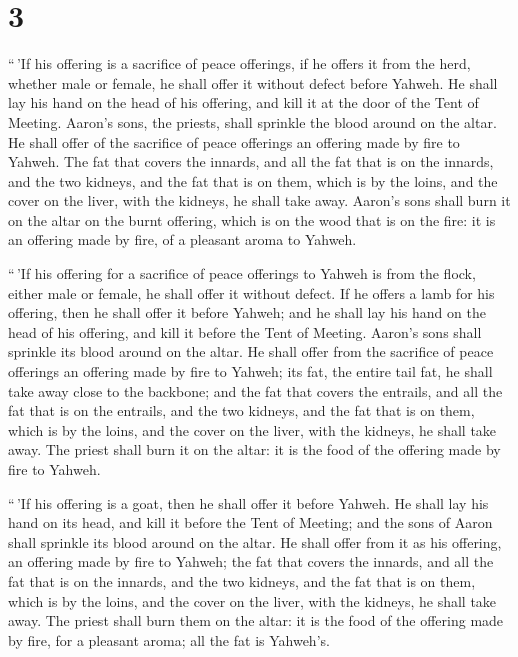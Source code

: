 \hypertarget{section-2}{%
\section{3}\label{section-2}}

 ``\,'If his offering is a sacrifice of peace offerings,
if he offers it from the herd, whether male or female, he shall offer it
without defect before Yahweh.  He shall lay his hand on
the head of his offering, and kill it at the door of the Tent of
Meeting. Aaron's sons, the priests, shall sprinkle the blood around on
the altar.  He shall offer of the sacrifice of peace
offerings an offering made by fire to Yahweh. The fat that covers the
innards, and all the fat that is on the innards,  and the
two kidneys, and the fat that is on them, which is by the loins, and the
cover on the liver, with the kidneys, he shall take away. 
Aaron's sons shall burn it on the altar on the burnt offering, which is
on the wood that is on the fire: it is an offering made by fire, of a
pleasant aroma to Yahweh.

 ``\,'If his offering for a sacrifice of peace offerings
to Yahweh is from the flock, either male or female, he shall offer it
without defect.  If he offers a lamb for his offering,
then he shall offer it before Yahweh;  and he shall lay
his hand on the head of his offering, and kill it before the Tent of
Meeting. Aaron's sons shall sprinkle its blood around on the altar.
 He shall offer from the sacrifice of peace offerings an
offering made by fire to Yahweh; its fat, the entire tail fat, he shall
take away close to the backbone; and the fat that covers the entrails,
and all the fat that is on the entrails,  and the two
kidneys, and the fat that is on them, which is by the loins, and the
cover on the liver, with the kidneys, he shall take away.
 The priest shall burn it on the altar: it is the food of
the offering made by fire to Yahweh.

 ``\,'If his offering is a goat, then he shall offer it
before Yahweh.  He shall lay his hand on its head, and
kill it before the Tent of Meeting; and the sons of Aaron shall sprinkle
its blood around on the altar.  He shall offer from it as
his offering, an offering made by fire to Yahweh; the fat that covers
the innards, and all the fat that is on the innards,  and
the two kidneys, and the fat that is on them, which is by the loins, and
the cover on the liver, with the kidneys, he shall take away.
 The priest shall burn them on the altar: it is the food
of the offering made by fire, for a pleasant aroma; all the fat is
Yahweh's.

